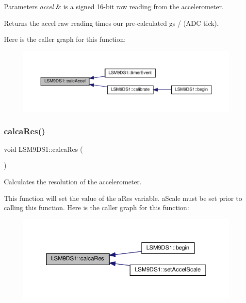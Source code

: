 \begin{DoxyParams}{Parameters}
{\em accel} & is a signed 16-\/bit raw reading from the accelerometer. \\
\hline
\end{DoxyParams}
\begin{DoxyReturn}{Returns}
the accel raw reading times our pre-\/calculated g\textquotesingle{}s / (A\+DC tick). 
\end{DoxyReturn}
Here is the caller graph for this function\+:
\nopagebreak
\begin{figure}[H]
\begin{center}
\leavevmode
\includegraphics[width=350pt]{classLSM9DS1_a54e2a7888b67b47cf0dd986c5b91a3c5_icgraph}
\end{center}
\end{figure}
\mbox{\label{classLSM9DS1_a31597c9ae6c5a7de64a50cbbbcd24297}} 
\subsubsection{\texorpdfstring{calca\+Res()}{calcaRes()}}
{\footnotesize\ttfamily void L\+S\+M9\+D\+S1\+::calca\+Res (\begin{DoxyParamCaption}{ }\end{DoxyParamCaption})\hspace{0.3cm}{\ttfamily [protected]}}



Calculates the resolution of the accelerometer. 

This function will set the value of the a\+Res variable. a\+Scale must be set prior to calling this function. Here is the caller graph for this function\+:
\nopagebreak
\begin{figure}[H]
\begin{center}
\leavevmode
\includegraphics[width=350pt]{classLSM9DS1_a31597c9ae6c5a7de64a50cbbbcd24297_icgraph}
\end{center}
\end{figure}
\mbox{\label{classLSM9DS1_a303e0dd33e000579dc3917aecedb6e63}} 
